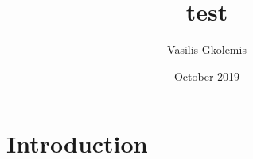\documentclass{article}
\title{test}
\author{Vasilis Gkolemis}
\date{October 2019}
\begin{document}
\maketitle

\section{Introduction}
\end{document}
